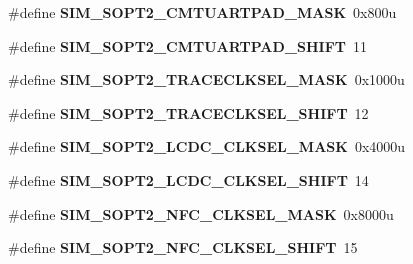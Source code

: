 \begin{DoxyCompactItemize}
\item 
\hypertarget{group___s_i_m___register___masks_ga75f28869dff38e35212b7213ec67b3e8}{}\#define {\bfseries S\+I\+M\+\_\+\+S\+O\+P\+T2\+\_\+\+C\+M\+T\+U\+A\+R\+T\+P\+A\+D\+\_\+\+M\+A\+S\+K}~0x800u\label{group___s_i_m___register___masks_ga75f28869dff38e35212b7213ec67b3e8}

\item 
\hypertarget{group___s_i_m___register___masks_gaf2803246b4f7ce7e5f0b5f31012548d1}{}\#define {\bfseries S\+I\+M\+\_\+\+S\+O\+P\+T2\+\_\+\+C\+M\+T\+U\+A\+R\+T\+P\+A\+D\+\_\+\+S\+H\+I\+F\+T}~11\label{group___s_i_m___register___masks_gaf2803246b4f7ce7e5f0b5f31012548d1}

\item 
\hypertarget{group___s_i_m___register___masks_ga332894211abcda547cbf5d5093bd3f72}{}\#define {\bfseries S\+I\+M\+\_\+\+S\+O\+P\+T2\+\_\+\+T\+R\+A\+C\+E\+C\+L\+K\+S\+E\+L\+\_\+\+M\+A\+S\+K}~0x1000u\label{group___s_i_m___register___masks_ga332894211abcda547cbf5d5093bd3f72}

\item 
\hypertarget{group___s_i_m___register___masks_ga6ce7d361b38ac28e6976c71569fe672b}{}\#define {\bfseries S\+I\+M\+\_\+\+S\+O\+P\+T2\+\_\+\+T\+R\+A\+C\+E\+C\+L\+K\+S\+E\+L\+\_\+\+S\+H\+I\+F\+T}~12\label{group___s_i_m___register___masks_ga6ce7d361b38ac28e6976c71569fe672b}

\item 
\hypertarget{group___s_i_m___register___masks_ga8e51f123d254a59b99b8e81c76c07e5c}{}\#define {\bfseries S\+I\+M\+\_\+\+S\+O\+P\+T2\+\_\+\+L\+C\+D\+C\+\_\+\+C\+L\+K\+S\+E\+L\+\_\+\+M\+A\+S\+K}~0x4000u\label{group___s_i_m___register___masks_ga8e51f123d254a59b99b8e81c76c07e5c}

\item 
\hypertarget{group___s_i_m___register___masks_gad4fb9dc9b48653f7d8844cf10c27b241}{}\#define {\bfseries S\+I\+M\+\_\+\+S\+O\+P\+T2\+\_\+\+L\+C\+D\+C\+\_\+\+C\+L\+K\+S\+E\+L\+\_\+\+S\+H\+I\+F\+T}~14\label{group___s_i_m___register___masks_gad4fb9dc9b48653f7d8844cf10c27b241}

\item 
\hypertarget{group___s_i_m___register___masks_ga7d722e3acc0f0450cd25fa133e04d6d1}{}\#define {\bfseries S\+I\+M\+\_\+\+S\+O\+P\+T2\+\_\+\+N\+F\+C\+\_\+\+C\+L\+K\+S\+E\+L\+\_\+\+M\+A\+S\+K}~0x8000u\label{group___s_i_m___register___masks_ga7d722e3acc0f0450cd25fa133e04d6d1}

\item 
\hypertarget{group___s_i_m___register___masks_gafe87c24c40f6d9c86ccf5768ce4c0b2a}{}\#define {\bfseries S\+I\+M\+\_\+\+S\+O\+P\+T2\+\_\+\+N\+F\+C\+\_\+\+C\+L\+K\+S\+E\+L\+\_\+\+S\+H\+I\+F\+T}~15\label{group___s_i_m___register___masks_gafe87c24c40f6d9c86ccf5768ce4c0b2a}


\end{DoxyCompactItemize}
